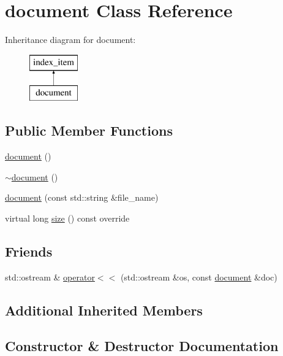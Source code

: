 \hypertarget{classdocument}{}\section{document Class Reference}
\label{classdocument}
Inheritance diagram for document\+:\begin{figure}[H]
\begin{center}
\leavevmode
\includegraphics[height=2.000000cm]{classdocument}
\end{center}
\end{figure}
\subsection*{Public Member Functions}
\begin{DoxyCompactItemize}
\item 
\hyperlink{classdocument_af1a85718219b8da6f1befaac0bf87989}{document} ()
\item 
\hyperlink{classdocument_afff6a78ede7767d8cbc0cb4566ae64da}{$\sim$document} ()
\item 
\hyperlink{classdocument_a750ac91b3537c59d0fff8e4a01085c98}{document} (const std\+::string \&file\+\_\+name)
\item 
virtual long \hyperlink{classdocument_aad56f03674964346987dc7afd18aacf1}{size} () const override
\end{DoxyCompactItemize}
\subsection*{Friends}
\begin{DoxyCompactItemize}
\item 
std\+::ostream \& \hyperlink{classdocument_af474a7f5ba29bca5df031898e86a8687}{operator$<$$<$} (std\+::ostream \&os, const \hyperlink{classdocument}{document} \&doc)
\end{DoxyCompactItemize}
\subsection*{Additional Inherited Members}


\subsection{Constructor \& Destructor Documentation}
\mbox{\label{classdocument_af1a85718219b8da6f1befaac0bf87989}} 
